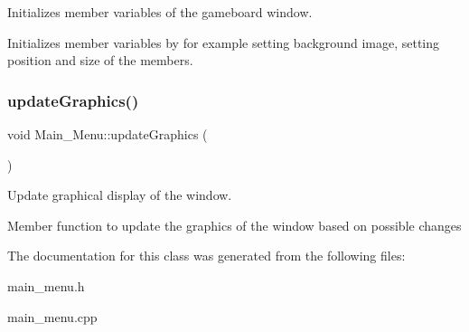 Initializes member variables of the gameboard window. 

Initializes member variables by for example setting background image, setting position and size of the members. \mbox{\label{classMain__Menu_aa12d253d587d418b84550fffbc077478}} 
\subsubsection{\texorpdfstring{update\+Graphics()}{updateGraphics()}}
{\footnotesize\ttfamily void Main\+\_\+\+Menu\+::update\+Graphics (\begin{DoxyParamCaption}{ }\end{DoxyParamCaption})}



Update graphical display of the window. 

Member function to update the graphics of the window based on possible changes 

The documentation for this class was generated from the following files\+:\begin{DoxyCompactItemize}
\item 
main\+\_\+menu.\+h\item 
main\+\_\+menu.\+cpp\end{DoxyCompactItemize}
